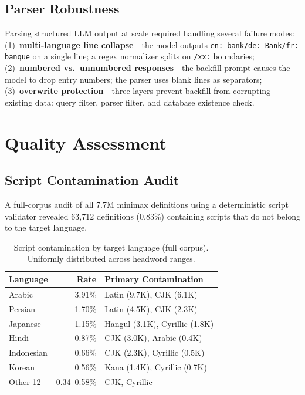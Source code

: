 \documentclass[11pt]{article}
\begin{document}
\subsection{Parser Robustness}

Parsing structured LLM output at scale required handling several failure modes: (1)~\textbf{multi-language line collapse}---the model outputs \texttt{en: bank/de: Bank/fr: banque} on a single line; a regex normalizer splits on \texttt{/xx:} boundaries; (2)~\textbf{numbered vs.\ unnumbered responses}---the backfill prompt causes the model to drop entry numbers; the parser uses blank lines as separators; (3)~\textbf{overwrite protection}---three layers prevent backfill from corrupting existing data: query filter, parser filter, and database existence check.


\section{Quality Assessment}
\label{sec:quality}

\subsection{Script Contamination Audit}

A full-corpus audit of all 7.7M minimax definitions using a deterministic script validator revealed 63,712 definitions (0.83\%) containing scripts that do not belong to the target language.

\begin{table}[t]
\centering
\small
\begin{tabular}{lrp{3.8cm}}
\toprule
\textbf{Language} & \textbf{Rate} & \textbf{Primary Contamination} \\
\midrule
Arabic    & 3.91\% & Latin (9.7K), CJK (6.1K) \\
Persian   & 1.70\% & Latin (4.5K), CJK (2.3K) \\
Japanese  & 1.15\% & Hangul (3.1K), Cyrillic (1.8K) \\
Hindi     & 0.87\% & CJK (3.0K), Arabic (0.4K) \\
Indonesian & 0.66\% & CJK (2.3K), Cyrillic (0.5K) \\
Korean    & 0.56\% & Kana (1.4K), Cyrillic (0.7K) \\
Other 12  & {0.34--0.58\%} & CJK, Cyrillic \\
\bottomrule
\end{tabular}
\caption{Script contamination by target language (full corpus). Uniformly distributed across headword ranges.}
\label{tab:contamination}
\end{table}
\end{document}
